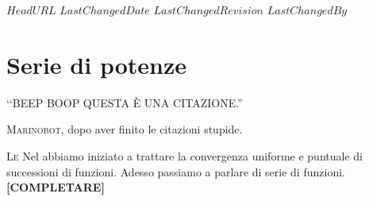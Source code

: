 \svnidlong
{$HeadURL$}
{$LastChangedDate$}
{$LastChangedRevision$}
{$LastChangedBy$}

\chapter{Serie di potenze}

\begin{introduction}
	‘‘BEEP BOOP QUESTA È UNA CITAZIONE.''
	\begin{flushright}
		\textsc{Marinobot,} dopo aver finito le citazioni stupide.
	\end{flushright}
\end{introduction}
\lettrine[findent=1pt, nindent=0pt]{L}{e} Nel  abbiamo iniziato a trattare la convergenza uniforme e puntuale di successioni di funzioni. Adesso passiamo a parlare di serie di funzioni.
\textbf{[COMPLETARE]} %
